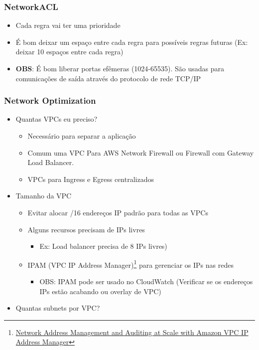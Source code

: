 \begin{frame}
	\frametitle{NetworkACL}
	\begin{itemize}
		\item Cada regra vai ter uma prioridade
		\item É bom deixar um espaço entre cada regra para possíveis regras futuras (Ex: deixar 10 espaços entre cada regra)
		\item \textbf{OBS}: É bom liberar portas efêmeras (1024-65535). São usadas para comunicações de saída através do protocolo de rede TCP/IP
	\end{itemize}
\end{frame}

\begin{frame}[allowframebreaks]
	\frametitle{Network Optimization}
	\begin{itemize}
		\item Quantas VPCs eu preciso?
			\begin{itemize}
				\item Necessário para separar a aplicação
				\item Comum uma VPC Para AWS Network Firewall ou Firewall com Gateway Load Balancer.
				\item VPCs para Ingress e Egress centralizados
			\end{itemize}
		\item Tamanho da VPC
			\begin{itemize}
				\item Evitar alocar /16 endereços IP padrão para todas as VPCs
				\item Alguns recursos precisam de IPs livres 
					\begin{itemize}
						\item Ex: Load balancer precisa de 8 IPs livres)
					\end{itemize}
				\item IPAM (VPC IP Address Manager)\footnote{\href{https://aws.amazon.com/blogs/aws/network-address-management-and-auditing-at-scale-with-amazon-vpc-ip-address-manager/}{Network Address Management and Auditing at Scale with Amazon VPC IP Address Manager}} para gerenciar os IPs nas redes
					\begin{itemize}
						\item OBS: IPAM pode ser usado no CloudWatch (Verificar se os endereços IPs estão acabando ou overlay de VPC)
					\end{itemize}
			\end{itemize}
		\framebreak
		\item Quantas subnets por VPC?

\end{itemize}
\end{frame}
